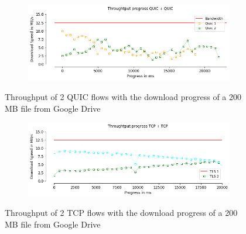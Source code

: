 \begin{frame}

\begin{figure}[!htb]
    \centering
    \begin{subfigure}{0.5\textwidth}
        \includegraphics[width=\linewidth]{./plots/PI/throughput/ThroughtputprogressQUIC+QUIC.png}
    \end{subfigure}
    
    \caption{Throughput of 2 QUIC flows with the download progress of a 200 MB file from Google Drive}\label{fig:throughput-of-2y}
\end{figure}

\begin{figure}[!htb]
    \centering
    \begin{subfigure}{0.5\textwidth}
        \includegraphics[width=\linewidth]{./plots/PI/throughput/ThroughtputprogressTCP+TCP.png}
    \end{subfigure}
    
    \caption{Throughput of 2 TCP flows with the download progress of a 200 MB file from Google Drive}\label{fig:throughput-of-2g}
\end{figure}

\end{frame}
\clearpage

